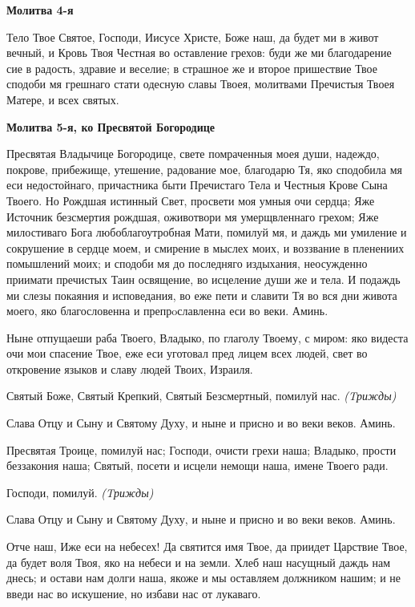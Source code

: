 \bfseries Молитва 4-я\normalfont{}


Тело Твое Святое, Господи, Иисусе Христе, Боже наш, да будет ми в живот вечный, и Кровь Твоя Честная во оставление грехов: буди же ми благодарение сие в радость, здравие и веселие; в страшное же и второе пришествие Твое сподоби мя грешнаго стати одесную славы Твоея, молитвами Пречистыя Твоея Матере, и всех святых.




\bfseries Молитва 5-я, ко Пресвятой Богородице\normalfont{}


Пресвятая Владычице Богородице, свете помраченныя моея души, надеждо, покрове, прибежище, утешение, радование мое, благодарю Тя, яко сподобила мя еси недостойнаго, причастника быти Пречистаго Тела и Честныя Крове Сына Твоего. Но Рождшая истинный Свет, просвети моя умныя очи сердца; Яже Источник безсмертия рождшая, оживотвори мя умерщвленнаго грехом; Яже милостиваго Бога любоблагоутробная Мати, помилуй мя, и даждь ми умиление и сокрушение в сердце моем, и смирение в мыслех моих, и воззвание в пленениих помышлений моих; и сподоби мя до последняго издыхания, неосужденно приимати пречистых Таин освящение, во исцеление души же и тела. И подаждь ми слезы покаяния и исповедания, во еже пети и славити Тя во вся дни живота моего, яко благословенна и препрoславленна еси во веки. Аминь.


Ныне отпущаеши раба Твоего, Владыко, по глаголу Твоему, с миром: яко видеста очи мои спасение Твое, еже еси уготовал пред лицем всех людей, свет во откровение языков и славу людей Твоих, Израиля.


Святый Боже, Святый Крепкий, Святый Безсмертный, помилуй нас. \itshape (Tрижды)\normalfont{}


Слава Отцу и Сыну и Святому Духу, и ныне и присно и во веки веков. Аминь.


Пресвятая Троице, помилуй нас; Господи, очисти грехи наша; Владыко, прости беззакония наша; Святый, посети и исцели немощи наша, имене Твоего ради.


Господи, помилуй. \itshape (Tрижды)\normalfont{}


Слава Отцу и Сыну и Святому Духу, и ныне и присно и во веки веков. Аминь.


Отче наш, Иже еси на небесех! Да святится имя Твое, да приидет Царствие Твое, да будет воля Твоя, яко на небеси и на земли. Хлеб наш насущный даждь нам днесь; и остави нам долги наша, якоже и мы оставляем должником нашим; и не введи нас во искушение, но избави нас от лукаваго.




